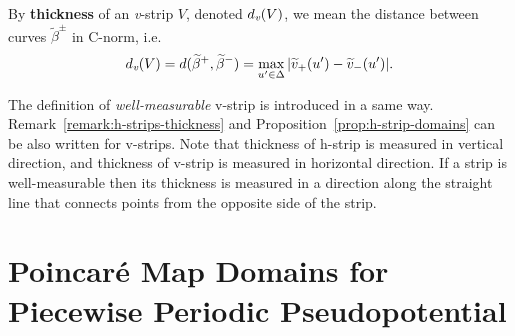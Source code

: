 \begin{definition}
\label{def:v-thickness}
	By {\bf thickness} of an \emph{v}-strip $V$, denoted $d_\emph{v}(V)$, we mean the distance between curves $\widetilde{\beta}^{\pm}$ in C-norm, i.e.
	\begin{equation}
		d_\emph{v}(V) = d(\widetilde{\beta}^+, \widetilde{\beta}^-) = \max \limits_{u' \in \Delta} |\widetilde{v}_+(u') - \widetilde{v}_-(u')|.
	\label{eq:v-thickness}
	\end{equation}
\end{definition}

The definition of {\it well-measurable} v-strip is introduced in a same way.
Remark~\ref{remark:h-strips-thickness} and Proposition~\ref{prop:h-strip-domains} can be also written for v-strips.
Note that thickness of h-strip is measured in vertical direction, and thickness of v-strip is measured in horizontal direction.
If a strip is well-measurable then its thickness is measured in a direction along the straight line that connects points from the opposite side of the strip.

\section{Poincar\'e Map Domains for Piecewise Periodic Pseudopotential}
\label{section:poincare-map-domains-piecewise}


